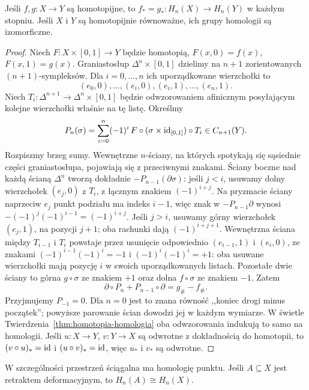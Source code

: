 \begin{twierdzenie}
\label{thm:homotopia-singularna}
Jeśli $f,g:X\to Y$ są homotopijne, to
$f_*=g_*:H_n(X)\to H_n(Y)$ w każdym stopniu.
Jeśli $X$ i $Y$ są homotopijnie równoważne,
ich grupy homologii są izomorficzne.
\end{twierdzenie}
\begin{proof}
Niech $F:X\times[0,1]\to Y$ będzie
homotopią, $F(x,0)=f(x)$,
$F(x,1)=g(x)$.
Graniastosłup $\Delta^n\times[0,1]$
dzielimy na $n+1$ zorientowanych
$(n+1)$-sympleksów. Dla $i=0,\ldots,n$
ich uporządkowane wierzchołki to
\[
 (e_0,0),\ldots,(e_i,0),
 (e_i,1),\ldots,(e_n,1).
\]
Niech $T_i:\Delta^{n+1}\to
\Delta^n\times[0,1]$ będzie odwzorowaniem
afinicznym posyłającym kolejne wierzchołki
właśnie na tę listę. Określmy
\[
 P_n(\sigma)=\sum_{i=0}^n(-1)^i\,
 F\circ(\sigma\times\mathrm{id}_{[0,1]})\circ T_i
 \in C_{n+1}(Y).
\]
Rozpiszmy brzeg sumy. Wewnętrzne
$n$-ściany, na których spotykają się
sąsiednie części graniastosłupa,
pojawiają się z przeciwnymi znakami.
Ściany boczne nad każdą ścianą
$\Delta^n$ tworzą dokładnie
$-P_{n-1}(\partial\sigma)$:
jeśli $j<i$, usuwamy dolny wierzchołek $(e_j,0)$
z $T_i$, z łącznym znakiem $(-1)^{i+j}$.
Na pryzmacie ściany naprzeciw $e_j$ punkt podziału ma indeks $i-1$,
więc znak w $-P_{n-1}\partial$ wynosi
$-(-1)^j(-1)^{i-1}=(-1)^{i+j}$.
Jeśli $j>i$, usuwamy górny wierzchołek $(e_j,1)$,
na pozycji $j+1$; oba rachunki dają $(-1)^{i+j+1}$.
Wewnętrzna ściana między $T_{i-1}$ i $T_i$ powstaje
przez usunięcie odpowiednio $(e_{i-1},1)$ i $(e_i,0)$,
ze znakami $(-1)^{i-1}(-1)^i=-1$ i
$(-1)^i(-1)^i=+1$: oba usuwane wierzchołki
mają pozycję $i$ w swoich uporządkowanych listach.
Pozostałe dwie ściany to górna
$g\circ\sigma$ ze znakiem $+1$
oraz dolna $f\circ\sigma$ ze
znakiem $-1$. Zatem
\begin{equation}\label{eq:prism-identity}
 \partial\circ P_n+P_{n-1}\circ\partial
 =g_\#-f_\#.
\end{equation}
Przyjmujemy $P_{-1}=0$. Dla $n=0$ jest to znana równość
,,koniec drogi minus początek'';
powyższe parowanie ścian dowodzi
jej w każdym wymiarze. W świetle
Twierdzenia~\ref{thm:homotopia-homologia}
oba odwzorowania indukują to samo na homologii.
Jeśli $u:X\to Y$, $v:Y\to X$
są odwrotne z dokładnością do homotopii,
to $(v\circ u)_*=\mathrm{id}$ i $(u\circ v)_*=\mathrm{id}$,
więc $u_*$ i $v_*$ są odwrotne.
\end{proof}

W szczególności przestrzeń ściągalna
ma homologię punktu. Jeśli
$A\subseteq X$ jest retraktem
deformacyjnym, to $H_n(A)\cong H_n(X)$.

